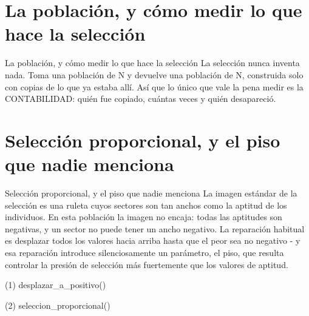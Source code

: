 \section{La población, y cómo medir lo que hace la selección}

\begin{frame}{La población, y cómo medir lo que hace la selección}
La selección nunca inventa nada. Toma una población de N y devuelve una
población de N, construida solo con copias de lo que ya estaba allí. Así que lo único
que vale la pena medir es la CONTABILIDAD: quién fue copiado, cuántas veces y
quién desapareció.
\end{frame}


\section{Selección proporcional, y el piso que nadie menciona}

\begin{frame}{Selección proporcional, y el piso que nadie menciona}
La imagen estándar de la selección es una ruleta cuyos sectores son tan anchos
como la aptitud de los individuos. En esta población la imagen no encaja: todas
las aptitudes son negativas, y un sector no puede tener un ancho negativo. La
reparación habitual es desplazar todos los valores hacia arriba hasta que el
peor sea no negativo - y esa reparación introduce silenciosamente un parámetro,
el piso, que resulta controlar la presión de selección más fuertemente que
los valores de aptitud.
\end{frame}

\begin{frame}[fragile]{(1) desplazar\_a\_positivo()}

\end{frame}

\begin{frame}[fragile]{(2) seleccion\_proporcional()}

\end{frame}

